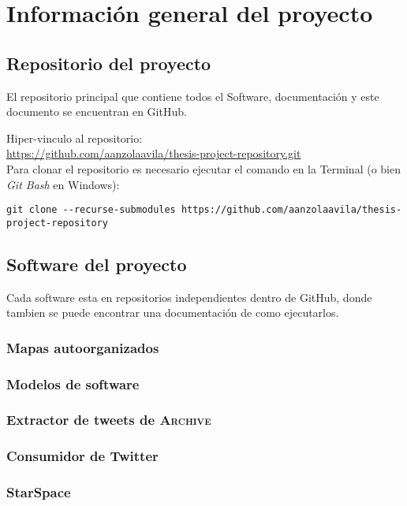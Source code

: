 
\chapter{Información general del proyecto} %

\label{appendix:projectinfo} %

\section{Repositorio del proyecto}
El repositorio principal que contiene todos el Software, documentación y este documento se encuentran en GitHub. \\

\begin{tcolorbox}[colback=gray!5!white,
  colframe=black!75!white,
  title=Repositorio de GitHub]
  Hiper-vinculo al repositorio: \\
  \hspace*{1em} \href{https://github.com/aanzolaavila/thesis-project-repository.git}{https://github.com/aanzolaavila/thesis-project-repository.git} \\ [1em]

  Para clonar el repositorio es necesario ejecutar el comando en la Terminal (o bien \textit{Git Bash} en Windows):
  \begin{verbatim}
git clone --recurse-submodules https://github.com/aanzolaavila/thesis-project-repository
  \end{verbatim}
\end{tcolorbox}

\section{Software del proyecto}
Cada software esta en repositorios independientes dentro de GitHub, donde tambien se puede encontrar una documentación de como ejecutarlos.

\subsection{Mapas autoorganizados}

\subsection{Modelos de software}

\subsection{Extractor de tweets de \textsc{Archive}}

\subsection{Consumidor de Twitter}

\subsection{StarSpace}
